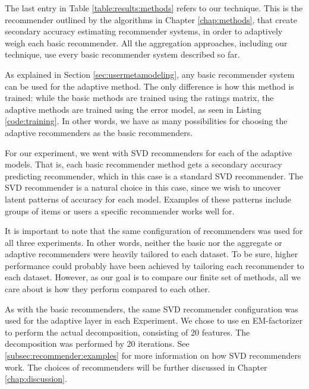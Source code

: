The last entry in Table \ref{table:results:methods}
refers to our technique. 
This is the recommender outlined by the algorithms
in Chapter \ref{chap:methods},
that create secondary accuracy estimating recommender systems,
in order to adaptively weigh each basic recommender.
All the aggregation approaches, including our technique,
use every basic recommender system described so far.

As explained in Section \ref{sec:usermetamodeling},
any basic recommender system can be used for the adaptive method.
The only difference is how this method is trained:
while the basic methods are trained using the ratings matrix,
the adaptive methods are trained using the error model,
as seen in Listing \ref{code:training}.
In other words, we have as many possibilities for choosing
the adaptive recommenders as the basic recommenders.

For our experiment, we went with SVD recommenders
for each of the adaptive models.
That is, each basic recommender method gets a secondary 
accuracy predicting recommender, which in this case is a 
standard SVD recommender.
The SVD recommender is a natural choice in this case,
since we wish to uncover latent patterns of accuracy
for each model.
Examples of these patterns include groups of items
or users a specific recommender works well for.

It is important to note that the same configuration of recommenders was used for all three experiments.
In other words, neither the basic nor the aggregate or adaptive recommenders were heavily tailored
to each dataset. To be sure, higher performance could probably have been achieved
by tailoring each recommender to each dataset. However,
as our goal is to compare our finite set of methods, all we care 
about is how they perform compared to each other.

As with the basic recommenders, the same SVD recommender configuration was used 
for the adaptive layer in each Experiment.
We chose to use en EM-factorizer to perform the actual decomposition,
consisting of 20 features. The decomposition was performed by 20 iterations.
See \ref{subsec:recommender:examples} for more information on how SVD recommenders work. 
The choices of recommenders will be further discussed
in Chapter \ref{chap:discussion}.

